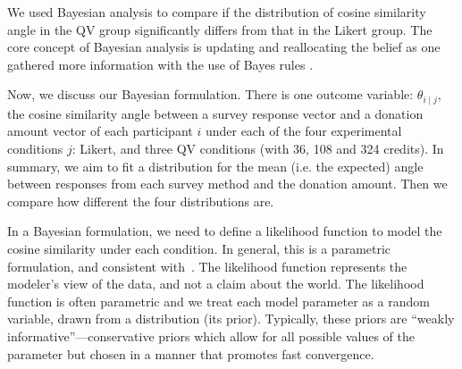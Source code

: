 We used Bayesian analysis to compare if the distribution of cosine similarity angle in the QV group significantly differs from that in the Likert group. The core concept of Bayesian analysis is updating and reallocating the belief as one gathered more information with the use of Bayes rules \cite{kruschke2010bayesian}.   

 
Now, we discuss our Bayesian formulation. There is one outcome variable: $\theta_{i \mid j}$, the cosine similarity angle between a survey response vector and a donation amount vector of each participant $i$  under each of the four experimental conditions $j$: Likert, and three QV conditions (with 36, 108 and 324 credits). In summary, we aim to fit a distribution for the mean (i.e. the expected) angle between responses from each survey method and the donation amount. Then we compare how different the four distributions are. 

In a Bayesian formulation, we need to define a likelihood function to model the cosine similarity under each condition. In general, this is a parametric formulation, and consistent with~\textcite{McElreath2015}. The likelihood function represents the modeler's view of the data, and not a claim about the world. The likelihood function is often parametric and we treat each model parameter as a random variable, drawn from a distribution (its prior). Typically, these priors are ``weakly informative''---conservative priors which allow for all possible values of the parameter but chosen in a manner that promotes fast convergence.


